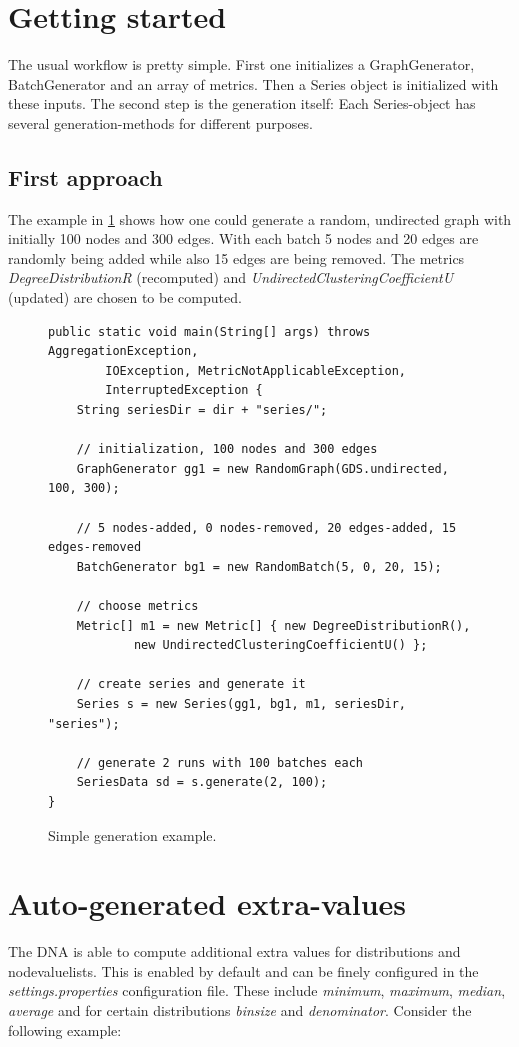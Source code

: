 \section{Getting started}
The usual workflow is pretty simple. First one initializes a GraphGenerator, BatchGenerator and an array of metrics. Then a Series object is initialized with these inputs. The second step is the generation itself: Each Series-object has several generation-methods for different purposes. 

\subsection{First approach}
The example in \ref{code:example1} shows how one could generate a random, undirected graph with initially 100 nodes and 300 edges. With each batch 5 nodes and 20 edges are randomly being added while also 15 edges are being removed. The metrics \textit{DegreeDistributionR} (recomputed) and \textit{UndirectedClusteringCoefficientU} (updated) are chosen to be computed. 

\begin{figure} [h]
\begin{lstlisting}
public static void main(String[] args) throws AggregationException,
		IOException, MetricNotApplicableException,
		InterruptedException {
	String seriesDir = dir + "series/";

	// initialization, 100 nodes and 300 edges
	GraphGenerator gg1 = new RandomGraph(GDS.undirected, 100, 300);
	
	// 5 nodes-added, 0 nodes-removed, 20 edges-added, 15 edges-removed
	BatchGenerator bg1 = new RandomBatch(5, 0, 20, 15);
	
	// choose metrics
	Metric[] m1 = new Metric[] { new DegreeDistributionR(),
			new UndirectedClusteringCoefficientU() };

	// create series and generate it
	Series s = new Series(gg1, bg1, m1, seriesDir, "series");
	
	// generate 2 runs with 100 batches each
	SeriesData sd = s.generate(2, 100);
}
\end{lstlisting}
\caption{Simple generation example.}
\label{code:example1}
\end{figure}

\section{Auto-generated extra-values}
The DNA is able to compute additional extra values for distributions and nodevaluelists. This is enabled by default and can be finely configured in the \textit{settings.properties} configuration file. These include \textit{minimum}, \textit{maximum}, \textit{median}, \textit{average} and for certain distributions \textit{binsize} and \textit{denominator}. Consider the following example:\\

